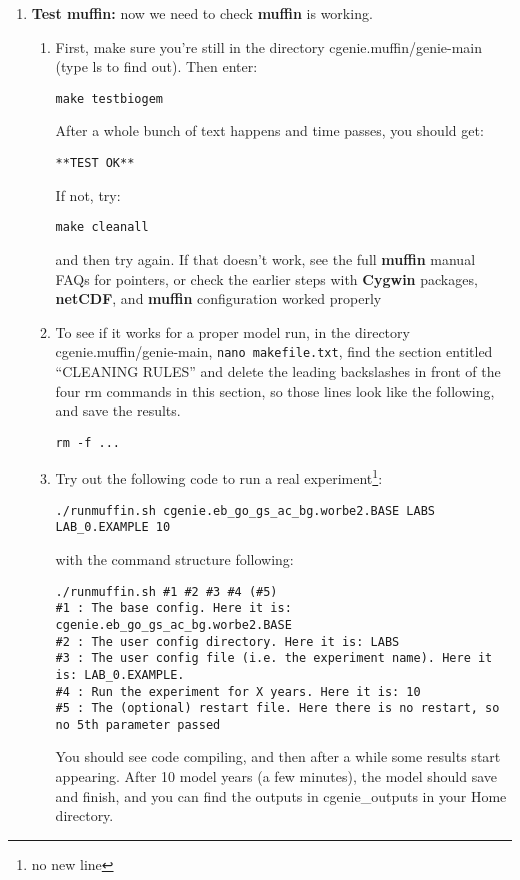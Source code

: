\documentclass[11pt,fleqn]{book} %
\begin{document}
\begin{enumerate}[noitemsep]
\vspace{2mm}
\item \textbf{Test muffin:} now we need to check \textbf{muffin} is
  working.
\begin{enumerate}[noitemsep]
\vspace{1mm}
\item First, make sure you’re still in the directory
  cgenie.muffin/genie-main (type ls to find out). Then enter:
\begin{verbatim}
make testbiogem
\end{verbatim}
After a whole bunch of text happens and time passes, you should get:
\begin{verbatim}
**TEST OK**
\end{verbatim}
If not, try:
\begin{verbatim}
make cleanall
\end{verbatim}
and then try again. If that doesn’t work, see the full \textbf{muffin}
manual FAQs for pointers, or check the earlier steps with
\textbf{Cygwin} packages, \textbf{netCDF}, and \textbf{muffin}
configuration worked properly
\vspace{1mm}
\item To see if it works for a proper model run, in the directory
  cgenie.muffin/genie-main, \texttt{nano makefile.txt}, find the
  section entitled ``CLEANING RULES'' and delete the leading
  backslashes in front of the four rm commands in this section, so
  those lines look like the following, and save the results.
\begin{verbatim}
rm -f ...
\end{verbatim}
\item Try out the following code to run a real experiment\footnote{no
  new line}:
\begin{verbatim}
./runmuffin.sh cgenie.eb_go_gs_ac_bg.worbe2.BASE LABS LAB_0.EXAMPLE 10
\end{verbatim}
with the command structure following:
\footnotesize\begin{verbatim}
./runmuffin.sh #1 #2 #3 #4 (#5)
#1 : The base config. Here it is: cgenie.eb_go_gs_ac_bg.worbe2.BASE
#2 : The user config directory. Here it is: LABS
#3 : The user config file (i.e. the experiment name). Here it is: LAB_0.EXAMPLE.
#4 : Run the experiment for X years. Here it is: 10
#5 : The (optional) restart file. Here there is no restart, so no 5th parameter passed
\end{verbatim}\normalsize
You should see code compiling, and then after a while some results
start appearing. After 10 model years (a few minutes), the model
should save and finish, and you can find the outputs in \textsf{\small
  cgenie\_outputs} in your Home directory.
\end{enumerate}


\end{enumerate}
\end{document}
